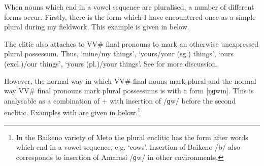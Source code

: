 When nouns which end in a vowel sequence are pluralised,
a number of different forms occur.
Firstly, there is the form 
which I have encountered once as a simple plural 
during my fieldwork. This example
is given in  below.

\begin{exe}
	\label{ex:Obs06/10/14}
\end{exe}

The clitic  also attaches to VV{\#} final pronouns
to mark an otherwise unexpressed plural possessum.
Thus,  `mine/my things',  `yours/your (sg.) things',
 `ours (excl.)/our things',  `yours (pl.)/your things'.
See  for more discussion.

However, the normal way in which VV{\#} final nouns mark plural
and the normal way VV{\#} final pronouns mark plural possessums
is with a form [ŋɡwɪn].
This is analysable as a combination of  + 
with insertion of /ɡw/ before the second enclitic.
Examples with are given in  below.\footnote{
		In the Baikeno variety of Meto the plural enclitic has the form 
		after words which end in a vowel sequence, e.g.  `cows'.
		Insertion of Baikeno /b/ also corresponds 
		to insertion of Amarasi /ɡw/ in other environments.}

